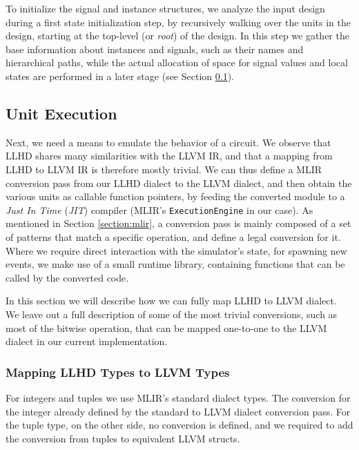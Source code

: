 To initialize the signal and instance structures, we analyze the input design during a first state initialization step, by recursively walking over the units in the design, starting at the top-level (or \textit{root}) of the design. In this step we gather the base information about instances and signals, such as their names and hierarchical paths, while the actual allocation of space for signal values and local states are performed in a later stage (see Section \ref{sec:execution}).


\subsection{Unit Execution}
\label{sec:execution}
Next, we need a means to emulate the behavior of a circuit. We observe that LLHD shares many similarities with the LLVM IR, and that a mapping from LLHD to LLVM IR is therefore mostly trivial. We can thus define a MLIR conversion pass from our LLHD dialect to the LLVM dialect, and then obtain the various units as callable function pointers, by feeding the converted module to a \textit{Just In Time} (\textit{JIT}) compiler (MLIR's \texttt{ExecutionEngine} in our case). As mentioned in Section \ref{section:mlir}, a conversion pass is mainly composed of a set of patterns that match a specific operation, and define a legal conversion for it. Where we require direct interaction with the simulator's state, \eg for spawning new events, we make use of a small runtime library, containing functions that can be called by the converted code.

In this section we will describe how we can fully map LLHD to LLVM dialect. We leave out a full description of some of the most trivial conversions, such as most of the bitwise operation, that can be mapped one-to-one to the LLVM dialect in our current implementation.


\subsubsection{Mapping LLHD Types to LLVM Types}
\label{sec:typeconv}
For integers and tuples we use MLIR's standard dialect types. The conversion for the integer already defined by the standard to LLVM dialect conversion pass. For the tuple type, on the other side, no conversion is defined, and we required to add the conversion from tuples to equivalent LLVM structs.

